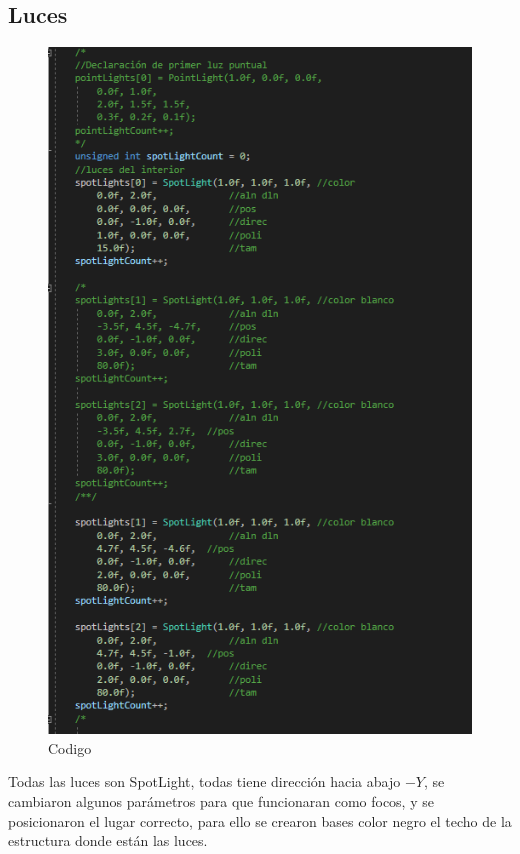 \documentclass[letter,12pt]{article}
\begin{document}
\subsection{Luces}
\begin{figure}[H]
		\includegraphics[scale=0.7]{img/img8}
		\centering
		\caption{Codigo}
	\end{figure}

Todas las luces son SpotLight, todas tiene dirección hacia abajo $-Y$, se cambiaron algunos parámetros para que funcionaran como focos, y se posicionaron el lugar correcto, para ello se crearon bases color negro el techo de la estructura donde están las luces.
\end{document}
